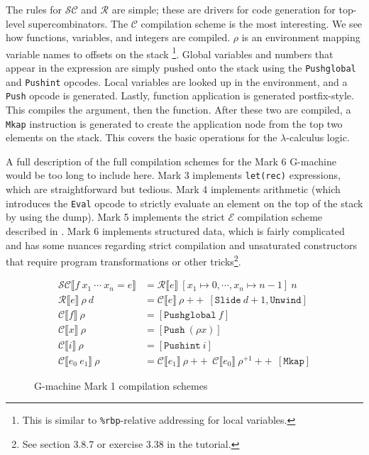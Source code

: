 The rules for $\mathcal{SC}$ and $\mathcal{R}$ are simple; these are drivers for code generation for top-level supercombinators. The $\mathcal{C}$ compilation scheme is the most interesting. We see how functions, variables, and integers are compiled. $\rho$ is an environment mapping variable names to offsets on the stack \footnote{This is similar to \texttt{\%rbp}-relative addressing for local variables.}. Global variables and numbers that appear in the expression are simply pushed onto the stack using the \texttt{Pushglobal} and \texttt{Pushint} opcodes. Local variables are looked up in the environment, and a \texttt{Push} opcode is generated. Lastly, function application is generated postfix-style. This compiles the argument, then the function. After these two are compiled, a \texttt{Mkap} instruction is generated to create the application node from the top two elements on the stack. This covers the basic operations for the $\lambda$-calculus logic.

A full description of the full compilation schemes for the Mark 6 G-machine would be too long to include here. Mark 3 implements \texttt{let(rec)} expressions, which are straightforward but tedious. Mark 4 implements arithmetic (which introduces the \texttt{Eval} opcode to strictly evaluate an element on the top of the stack by using the dump). Mark 5 implements the strict $\mathcal{E}$ compilation scheme described in . Mark 6 implements structured data, which is fairly complicated and has some nuances regarding strict compilation and unsaturated constructors that require program transformations or other tricks\footnote{See section 3.8.7 or exercise 3.38 in the tutorial.}.

\begin{figure}
  \centering
  \begin{align*}
    \mathcal{SC}\llbracket f\ x_1\ \cdots\ x_n=e\rrbracket &= \mathcal{R}\llbracket e\rrbracket\ [x_1\mapsto 0,\cdots,x_n\mapsto n-1]\ n \\
    \mathcal{R}\llbracket e\rrbracket\ \rho\ d &= \mathcal{C}\llbracket e\rrbracket\ \rho\ \mathtt{++}\ [\mathtt{Slide}\ d+1,\mathtt{Unwind}] \\
    \mathcal{C}\llbracket f\rrbracket\ \rho &= [\mathtt{Pushglobal}\ f] \\
    \mathcal{C}\llbracket x\rrbracket\ \rho &= [\mathtt{Push}\ (\rho x)] \\
    \mathcal{C}\llbracket i\rrbracket\ \rho &= [\mathtt{Pushint}\ i] \\
    \mathcal{C}\llbracket e_0\ e_1\rrbracket\ \rho &= \mathcal{C}\llbracket e_1\rrbracket\ \rho\ \mathtt{++}\ \mathcal{C}\llbracket e_0 \rrbracket\ \rho^{+1}\ \mathtt{++}\ [\mathtt{Mkap}]
  \end{align*}
  \caption{G-machine Mark 1 compilation schemes}
  \label{fig:gm-compilation-schemes}
\end{figure}

